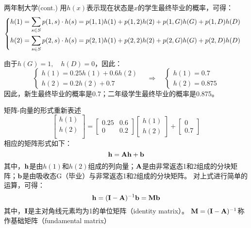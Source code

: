 \documentclass[t]{beamer}
\begin{document}
\begin{frame}{两年制大学(cont.)}\small
    用$h(x)$表示现在状态是$x$的学生最终毕业的概率，可得：
    \[\begin{cases}
     \vspace{1ex}  h(1)=\displaystyle\sum_{s\in S} p(1,s)\cdot h(s)=p(1,1)h(1)+p(1,2)h(2)+p(1,G)h(G)+p(1,D)h(D)\\
    h(2)=\displaystyle\sum_{s\in S} p(2,s)\cdot h(s)=p(2,1)h(1)+p(2,2)h(2)+p(2,G)h(G)+p(2,D)h(D)
    \end{cases} \]
    
    由于$h(G)=1,\quad h(D)=0$，因此：
    \[\begin{cases}
    h(1)=0.25h(1)+0.6h(2)\\
    h(2)=0.2h(2)+0.7
    \end{cases} \quad\Rightarrow\quad \begin{cases}
    h(1)=0.7\\
    h(2)=0.875
    \end{cases}\]
    因此，新生最终毕业的概率是0.7；二年级学生最终毕业的概率是0.875。
\end{frame}


\begin{frame}{矩阵-向量的形式重新表述}
    \[\begin{bmatrix}
        h(1)\\
        h(2)\\
        \end{bmatrix}=\begin{bmatrix}
        0.25 & 0.6\\
        0 &0.2
        \end{bmatrix}\begin{bmatrix}
        h(1)\\h(2)
        \end{bmatrix}+\begin{bmatrix}
        0\\0.7
        \end{bmatrix} \]
        相应的矩阵形式如下：
        \begin{equation*}
        {\bf h}={\bf Ah}+{\bf b}
        \end{equation*}
        其中，${\bf h}$是由$h(1)$和$h(2)$组成的列向量；${\bf A}$是由非常返态1和2组成的分块矩阵；${\bf b}$是由吸收态G（毕业）与非常返态1和2组成的分块矩阵。
        对上式进行简单的运算，可得：
        \begin{equation*}
       {\bf h}=({\bf I}-{\bf A})^{-1}{\bf b}={\bf M}{\bf b}
       \end{equation*}
       其中，${\bf I}$是主对角线元素均为1的单位矩阵（identity matrix）。 ${\bf M}=({\bf I}-{\bf A})^{-1}$称作基础矩阵（fundamental matrix）   
\end{frame}
\end{document}
